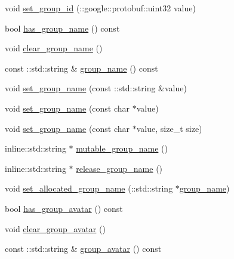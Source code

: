 \begin{DoxyCompactItemize}
\item 
void \hyperlink{class_i_m_1_1_base_define_1_1_server_group_info_a50e3491efdc7f4b79f9bc8716b51a5db}{set\+\_\+group\+\_\+id} (\+::google\+::protobuf\+::uint32 value)
\item 
bool \hyperlink{class_i_m_1_1_base_define_1_1_server_group_info_aa3db23e14e9516520fc5efced980268e}{has\+\_\+group\+\_\+name} () const 
\item 
void \hyperlink{class_i_m_1_1_base_define_1_1_server_group_info_af7b592dc05fb02527aaef902e74d6c34}{clear\+\_\+group\+\_\+name} ()
\item 
const \+::std\+::string \& \hyperlink{class_i_m_1_1_base_define_1_1_server_group_info_a4b8121dea8c6b622bc3d52c83e074519}{group\+\_\+name} () const 
\item 
void \hyperlink{class_i_m_1_1_base_define_1_1_server_group_info_a3affd85257297c1179f22e755e18f6f8}{set\+\_\+group\+\_\+name} (const \+::std\+::string \&value)
\item 
void \hyperlink{class_i_m_1_1_base_define_1_1_server_group_info_a05ad6bfe98987daf1c2718fb7b84c492}{set\+\_\+group\+\_\+name} (const char $\ast$value)
\item 
void \hyperlink{class_i_m_1_1_base_define_1_1_server_group_info_a89ad195bbbcc62576eb7d234b9d417d5}{set\+\_\+group\+\_\+name} (const char $\ast$value, size\+\_\+t size)
\item 
inline\+::std\+::string $\ast$ \hyperlink{class_i_m_1_1_base_define_1_1_server_group_info_abc75502614d1101cad9fd49fd45a09ea}{mutable\+\_\+group\+\_\+name} ()
\item 
inline\+::std\+::string $\ast$ \hyperlink{class_i_m_1_1_base_define_1_1_server_group_info_a393ed5973cd976d95c93ce092096943b}{release\+\_\+group\+\_\+name} ()
\item 
void \hyperlink{class_i_m_1_1_base_define_1_1_server_group_info_a7212a06e48904a1768ea25e63f71b2f7}{set\+\_\+allocated\+\_\+group\+\_\+name} (\+::std\+::string $\ast$\hyperlink{class_i_m_1_1_base_define_1_1_server_group_info_a4b8121dea8c6b622bc3d52c83e074519}{group\+\_\+name})
\item 
bool \hyperlink{class_i_m_1_1_base_define_1_1_server_group_info_a8554148366f3cb2e030df4076f7c832b}{has\+\_\+group\+\_\+avatar} () const 
\item 
void \hyperlink{class_i_m_1_1_base_define_1_1_server_group_info_a9a84526399296648d92f2a320cff9dc8}{clear\+\_\+group\+\_\+avatar} ()
\item 
const \+::std\+::string \& \hyperlink{class_i_m_1_1_base_define_1_1_server_group_info_a136e37741411db26876e3e121ff4214e}{group\+\_\+avatar} () const 

\end{DoxyCompactItemize}
